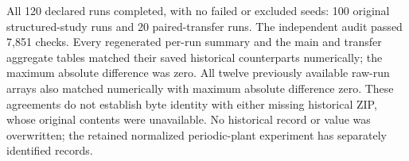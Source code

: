 All 120 declared runs completed, with no failed or excluded seeds:
100 original structured-study runs and 20 paired-transfer runs. The independent audit
passed 7,851 checks. Every regenerated per-run summary and the main and
transfer aggregate tables matched their saved historical counterparts
numerically; the maximum absolute difference was zero. All twelve
previously available raw-run arrays also matched numerically with
maximum absolute difference zero. These agreements do not establish
byte identity with either missing historical ZIP, whose original
contents were unavailable. No historical record or value was overwritten;
the retained normalized periodic-plant experiment has separately identified records.
